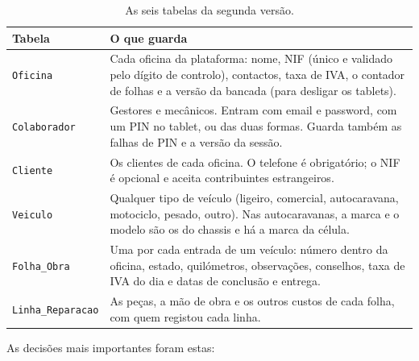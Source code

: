 \documentclass[a4paper,12pt]{article}
\begin{document}
\begin{table}[htbp]
\centering
\begin{tabularx}{\textwidth}{@{}p{3.4cm}L@{}}
\toprule
\textbf{Tabela} & \textbf{O que guarda} \\
\midrule
\texttt{Oficina} & Cada oficina da plataforma: nome, \ac{NIF} (único e validado pelo dígito de controlo), contactos, taxa de \ac{IVA}, o contador de folhas e a versão da bancada (para desligar os tablets). \\
\texttt{Colaborador} & Gestores e mecânicos. Entram com email e password, com um PIN no tablet, ou das duas formas. Guarda também as falhas de PIN e a versão da sessão. \\
\texttt{Cliente} & Os clientes de cada oficina. O telefone é obrigatório; o \ac{NIF} é opcional e aceita contribuintes estrangeiros. \\
\texttt{Veiculo} & Qualquer tipo de veículo (ligeiro, comercial, autocaravana, motociclo, pesado, outro). Nas autocaravanas, a marca e o modelo são os do chassis e há a marca da célula. \\
\texttt{Folha\_Obra} & Uma por cada entrada de um veículo: número dentro da oficina, estado, quilómetros, observações, conselhos, taxa de \ac{IVA} do dia e datas de conclusão e entrega. \\
\texttt{Linha\_Reparacao} & As peças, a mão de obra e os outros custos de cada folha, com quem registou cada linha. \\
\bottomrule
\end{tabularx}
\caption{As seis tabelas da segunda versão.}
\label{tab:tabelas}
\end{table}

As decisões mais importantes foram estas:
\end{document}
